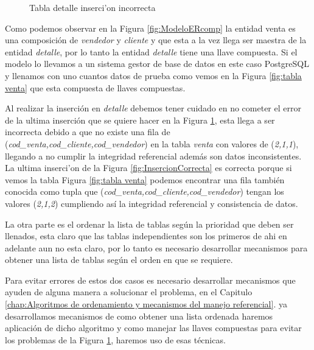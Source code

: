 \begin{figure}[H]
\centering
{}
\caption{Tabla detalle inserci'on incorrecta} \label{fig:InsercionIncorrecta}
\end{figure}
Como podemos observar en la Figura \ref{fig:ModeloERcomp} la entidad venta es una composici\'on de \textit{vendedor} y \textit{cliente} y que esta a la vez llega ser maestra de la entidad \textit{detalle}, por lo tanto la entidad \textit{detalle} tiene una llave compuesta. Si el modelo lo llevamos a un sistema gestor de base de datos en este caso PostgreSQL y llenamos con uno cuantos datos de prueba como vemos en la Figura \ref{fig:tabla venta} que esta compuesta de llaves compuestas.

Al realizar la inserci\'on en \textit{detalle} debemos tener cuidado en no cometer el error de la ultima inserci\'on que se quiere hacer en la Figura \ref{fig:InsercionIncorrecta}, esta llega a ser incorrecta debido a que no existe una fila de (\textit{cod\_venta,cod\_cliente,cod\_vendedor}) en la tabla \textit{venta} con valores de (\textit{2,1,1}), llegando a no cumplir la integridad referencial adem\'as son datos inconsistentes. La ultima inserci'on de la Figura \ref{fig:InsercionCorrecta} es correcta porque si vemos la tabla Figura \ref{fig:tabla venta} podemos encontrar una fila tambi\'en conocida como tupla que (\textit{cod\_venta,cod\_cliente,cod\_vendedor}) tengan los valores (\textit{2,1,2}) cumpliendo as\'i la integridad referencial y consistencia de datos.
  
  
La otra parte es el ordenar la lista de tablas seg\'un la prioridad que deben ser llenados, esta claro que las tablas independientes son los primeros de ahi en adelante aun no esta claro, por lo tanto es necesario desarrollar mecanismos para obtener una lista de tablas seg\'un el orden en que se requiere.

Para evitar errores de estos dos casos es necesario desarrollar mecanismos que ayuden de alguna manera a solucionar el problema, en el Capitulo \ref{chap:Algoritmos de ordenamiento y mecanismos del manejo referencial}. ya desarrollamos mecanismos de como obtener una lista ordenada haremos aplicaci\'on de dicho algoritmo y como manejar las llaves compuestas para evitar los problemas de la Figura \ref{fig:InsercionIncorrecta}, haremos uso de esas t\'ecnicas.
